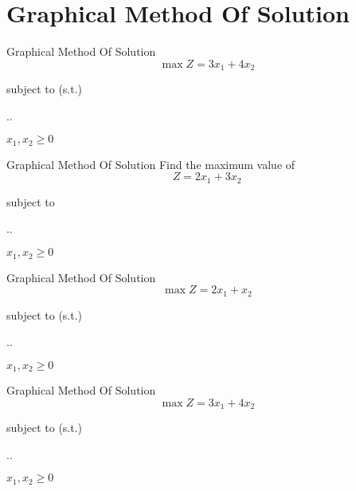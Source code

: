 
\section{Graphical Method Of Solution}
\label{sec:graphical-method}

\begin{frameExample}{Graphical Method Of Solution}{}
  \[ \max Z = 3x_1 + 4x_2\]

  {\centering
    subject to (s.t.)

    \sysdelim..%

    \vspace{5mm}
    $x_1, x_2 \geq 0$
  \par}
\end{frameExample}


\begin{frameExample}{Graphical Method Of Solution}{}
  Find the maximum value of \[ Z = 2x_1 + 3x_2\]
  {\centering
    subject to

    \sysdelim..%

    $x_1, x_2 \geq 0$
    \par}
  
\end{frameExample}

\begin{frameExample}{Graphical Method Of Solution}{}
  \[\max Z = 2x_1 + x_2 \]

  {\centering
    subject to (s.t.)

    \sysdelim..%

    \vspace{5mm}

    $x_1 , x_2 \geq 0$
  \par}
\end{frameExample}

\begin{frameExample}{Graphical Method Of Solution}{}
    \[\max Z = 3x_1 + 4x_2 \]

  {\centering
    subject to (s.t.)

    \sysdelim..%

    \vspace{5mm}

    $x_1 , x_2 \geq 0$
  \par}
\end{frameExample}


